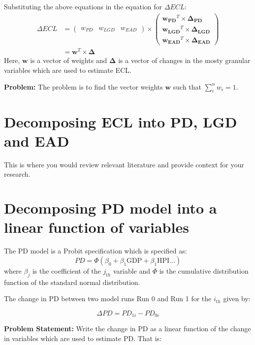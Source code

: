 \documentclass{article}
\numberwithin{equation}{section}
\begin{document}
Substituting the above equations in the equation for $\Delta ECL$:
\begin{align*}
  \Delta ECL &=
  \begin{pmatrix}
    w_{PD} & w_{LGD} & w_{EAD} 
  \end{pmatrix}
  \times 
  \begin{pmatrix}
    \mathbf{w_{PD}}^T \times \mathbf{\Delta_{PD}} \\ \mathbf{w_{LGD}}^T \times \mathbf{\Delta_{LGD}} \\ \mathbf{w_{EAD}}^T \times \mathbf{\Delta_{EAD}}
  \end{pmatrix} \\
  &= \mathbf{w}^T \times \mathbf{\Delta}
\end{align*}
Here, $\mathbf{w}$ is a vector of weights and $\mathbf{\Delta}$ is a vector of changes in the mosty granular variables which are used to estimate ECL.

\textbf{Problem: }
The problem is to find the vector weights $\mathbf{w}$ such that $\sum_{i}^{n} {w_i} = 1$.




\section{Decomposing ECL into PD, LGD and EAD}
This is where you would review relevant literature and provide context for your research.

\section{Decomposing PD model into a linear function of variables}
The PD model is a Probit specification which is specified as:
\begin{equation} PD  = \Phi (\beta_0 + \beta_1 \text{GDP} + \beta_1 \text{HPI} \hdots ) \end{equation}
where $\beta_j$ is the coefficient of the $j_{th}$ variable and $\Phi$ is the cumulative distribution function of the standard normal distribution.

The change in PD between two model runs Run 0 and Run 1 for the $i_{th}$ given by:

\begin{equation} \Delta PD = PD_{1i} - PD_{0i} \end{equation}

\textbf{Problem Statement:} Write the change in PD as a linear function of the change in variables which are used to estimate PD. That is:
\end{document}
